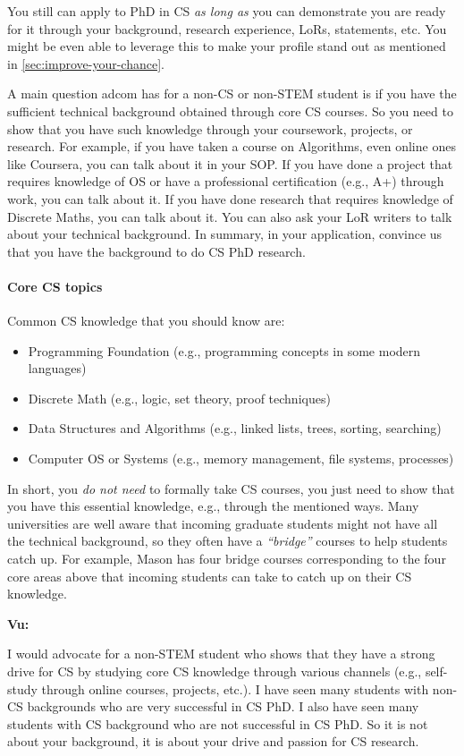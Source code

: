 \documentclass[oneside,11pt,dvipsnames]{book}
\newenvironment{commentbox}[1][]{
  \small
  \begin{mybox}
    {\small \textbf{#1}}
  }{
  \end{mybox}
}
\begin{document}
You still can apply to PhD in CS \emph{as long as} you can demonstrate you are ready for it through your background, research experience, LoRs, statements, etc. You might be even able to leverage this to make your profile stand out as mentioned in \autoref{sec:improve-your-chance}.

A main question adcom has for a non-CS or non-STEM student is if you have the sufficient technical background obtained through core CS courses.  So you need to show that you have such knowledge through your coursework, projects, or research.
For example, if you have taken a course on Algorithms, even online ones like Coursera, you can talk about it in your SOP.  If you have done a project that requires knowledge of OS or have a professional certification (e.g., A+) through work, you can talk about it.  If you have done research that requires knowledge of Discrete Maths, you can talk about it.  You can also ask your LoR writers to talk about your technical background.
In summary, in your application, convince us that you have the background to do CS PhD research.


\paragraph{Core CS topics} Common CS knowledge that you should know are:
\begin{itemize}
  \item Programming Foundation (e.g., programming concepts in some modern languages)
  \item Discrete Math (e.g., logic, set theory, proof techniques)
  \item Data Structures and Algorithms (e.g., linked lists, trees, sorting, searching)
  \item Computer OS or Systems (e.g., memory management, file systems, processes)
\end{itemize}

In short, you \emph{do not need} to formally take CS courses, you just need to show that you have this essential knowledge, e.g., through the mentioned ways. Many universities are well aware that incoming graduate students might not have all the technical background, so they often have a \emph{``bridge''} courses to help students catch up.  For example, Mason has four bridge courses corresponding to the four core areas above that incoming students can take to catch up on their CS knowledge.


\begin{commentbox}[Vu:]
  I would advocate for a non-STEM student who shows that they have a strong drive for CS by studying core CS knowledge through various channels (e.g., self-study through online courses, projects, etc.).  I have seen many students with non-CS backgrounds who are very successful in CS PhD.  I also have seen many students with CS background who are not successful in CS PhD.  So it is not about your background, it is about your drive and passion for CS research.
\end{commentbox}
\end{document}
